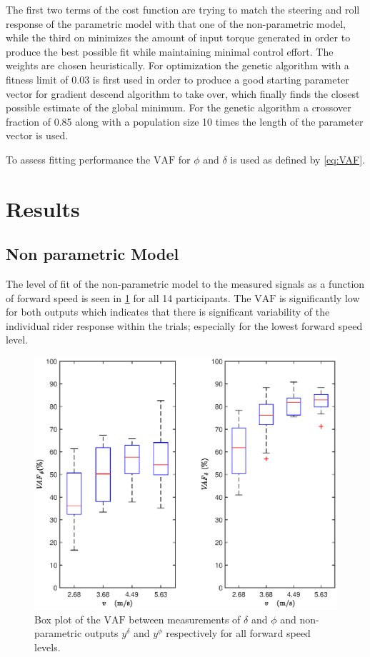 The first two terms  of the cost function are trying to match the steering and roll  response of the parametric model with that one of the non-parametric model, while the third on minimizes the amount of input torque generated in order to produce the best possible fit while maintaining minimal control effort. The weights are chosen heuristically. For optimization the genetic algorithm with a fitness limit of 0.03 is first  used in order to produce a good starting parameter vector for gradient descend algorithm to take over, which finally finds the closest possible estimate of the global minimum. For the genetic algorithm a crossover fraction of 0.85  along with a population size 10 times the length of the parameter vector is used. 

To assess fitting performance the \ensuremath{\mathrm{VAF}} for \ensuremath{\phi} and \ensuremath{\delta} is used as defined by \cref{eq:VAF}.
\section{Results}
\subsection{Non parametric Model}
The level of fit of the non-parametric model to the measured signals as a function of forward speed is seen in \cref{fig:FIT_FIR} for all 14 participants. The \ensuremath{\mathrm{VAF}} is significantly low for both outputs which indicates that there is significant variability of the individual rider response within the trials; especially for the lowest forward speed level. 
\begin{figure}[h!]
    \centering

    \includegraphics[width=\linewidth]{images/steer_irf/FIT_irf_steer.eps}
    \caption{Box plot of the  \ensuremath{\mathrm{VAF}} between measurements of \ensuremath{\delta} and \ensuremath{\phi} and non-parametric outputs \ensuremath{y^\delta} and \ensuremath{y^\phi} respectively for all forward speed levels.}
    \label{fig:FIT_FIR}
\end{figure}

